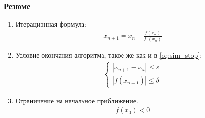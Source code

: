 \subsubsection{Резюме}
\begin{enumerate}
  \item Итерационная формула:
    \begin{align*}
      x_{n + 1} = x_n - \frac{f(x_n)}{f'(x_n)}
    \end{align*}
  \item Условие окончания алгоритма, такое же как и в \cref{eq:sim_stop}:
    \begin{align*}
      \begin{cases}
        |x_{n + 1} - x_n| \leq \varepsilon \\
        |f(x_{n+1})| \leq \delta
      \end{cases}
    \end{align*}
  \item Ограничение на начальное приближение:
    \begin{align*}
      f(x_0) < 0
    \end{align*}
\end{enumerate}
